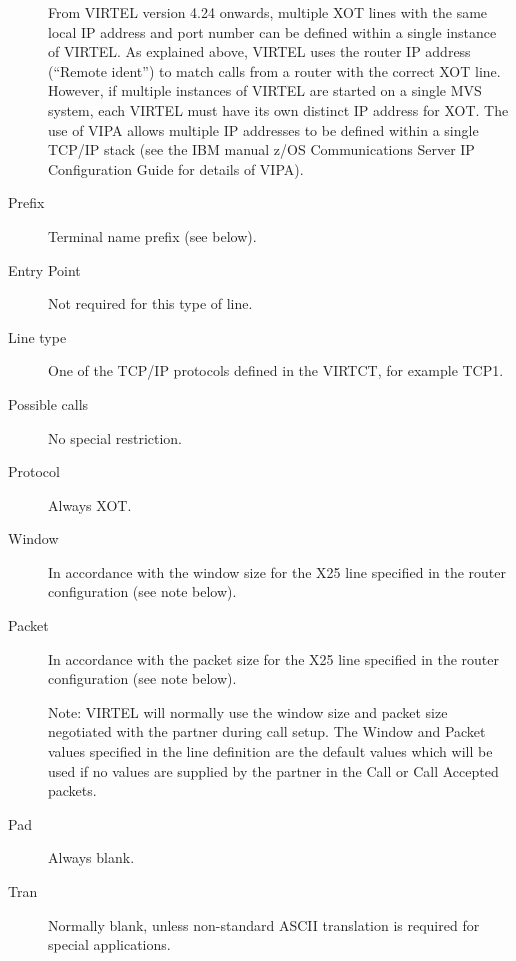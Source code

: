 \documentclass[letterpaper,10pt,english]{sphinxmanual}
\begin{document}
\begin{description}
From VIRTEL version 4.24 onwards, multiple XOT lines with the same local IP address and port number can be defined within a single instance of VIRTEL. As explained above, VIRTEL uses the router IP address (“Remote ident”) to match calls from a router with the correct XOT line. However, if multiple instances of VIRTEL are started on a single MVS system, each VIRTEL must have its own distinct IP address for XOT. The use of VIPA allows multiple IP addresses to be defined within a single TCP/IP stack (see the IBM manual z/OS Communications Server IP Configuration Guide for details of VIPA).

\item[{Prefix}] \leavevmode
Terminal name prefix (see below).

\item[{Entry Point}] \leavevmode
Not required for this type of line.

\item[{Line type}] \leavevmode
One of the TCP/IP protocols defined in the VIRTCT, for example TCP1.

\item[{Possible calls}] \leavevmode
No special restriction.

\item[{Protocol}] \leavevmode
Always XOT.

\item[{Window}] \leavevmode
In accordance with the window size for the X25 line specified in the router configuration (see note below).

\item[{Packet}] \leavevmode
In accordance with the packet size for the X25 line specified in the router configuration (see note below).

Note: VIRTEL will normally use the window size and packet size negotiated with the partner during call setup. The Window and Packet values specified in the line definition are the default values which will be used if no values are supplied by the partner in the Call or Call Accepted packets.

\item[{Pad}] \leavevmode
Always blank.

\item[{Tran}] \leavevmode
Normally blank, unless non-standard ASCII translation is required for special applications.

\end{description}

\end{document}
